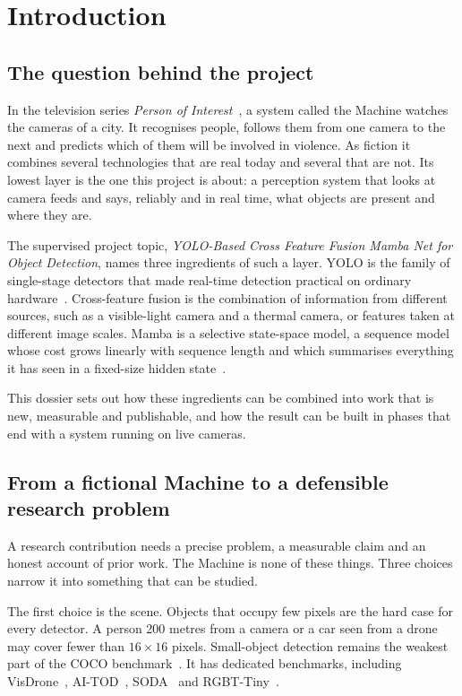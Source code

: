 \chapter{Introduction}
\label{ch:intro}

\section{The question behind the project}

In the television series \emph{Person of Interest}~\citep{poi2011}, a system
called the Machine watches the cameras of a city. It recognises people,
follows them from one camera to the next and predicts which of them will be
involved in violence. As fiction it combines several technologies that are
real today and several that are not. Its lowest layer is the one this
project is about: a perception system that looks at camera feeds and says,
reliably and in real time, what objects are present and where they are.

The supervised project topic, \emph{YOLO-Based Cross Feature Fusion Mamba
Net for Object Detection}, names three ingredients of such a layer. YOLO is
the family of single-stage detectors that made real-time detection practical
on ordinary hardware~\citep{yolo26_2026,wang2024yolov10,tian2025yolov12}.
Cross-feature fusion is the combination of information from different
sources, such as a visible-light camera and a thermal camera, or features
taken at different image scales. Mamba is a selective state-space model,
a sequence model whose cost grows linearly with sequence length and which
summarises everything it has seen in a fixed-size hidden
state~\citep{gu2023mamba}.

This dossier sets out how these ingredients can be combined into work that is
new, measurable and publishable, and how the result can be built in phases
that end with a system running on live cameras.

\section{From a fictional Machine to a defensible research problem}

A research contribution needs a precise problem, a measurable claim and an
honest account of prior work. The Machine is none of these things. Three
choices narrow it into something that can be studied.

The first choice is the scene. Objects that occupy few pixels are the hard
case for every detector. A person 200 metres from a camera or a car seen from
a drone may cover fewer than $16\times16$ pixels. Small-object detection
remains the weakest part of the COCO benchmark~\citep{lin2014coco}. It has
dedicated benchmarks, including VisDrone~\citep{zhu2021visdrone},
AI-TOD~\citep{xu2022aitodv2}, SODA~\citep{cheng2023soda} and
RGBT-Tiny~\citep{ying2025rgbttiny}.

